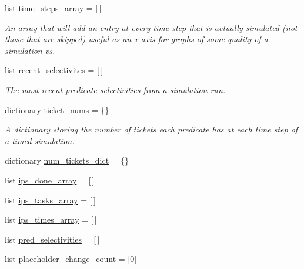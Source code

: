 \begin{DoxyCompactItemize}
list \mbox{\hyperlink{classdynamicfilterapp_1_1test__simulations_1_1_simulation_test_a75d7655922d64cff723f1ca630287683}{time\+\_\+steps\+\_\+array}} = \mbox{[}$\,$\mbox{]}
\begin{DoxyCompactList}\small\item\em An array that will add an entry at every time step that is actually simulated (not those that are skipped) useful as an x axis for graphs of some quality of a simulation vs. \end{DoxyCompactList}\item 
list \mbox{\hyperlink{classdynamicfilterapp_1_1test__simulations_1_1_simulation_test_a40252fb1880ae0d39411b74a939ca7d7}{recent\+\_\+selectivites}} = \mbox{[}$\,$\mbox{]}
\begin{DoxyCompactList}\small\item\em The most recent predicate selectivities from a simulation run. \end{DoxyCompactList}\item 
dictionary \mbox{\hyperlink{classdynamicfilterapp_1_1test__simulations_1_1_simulation_test_ae1cdb4bcaa53fc7ff453fd30fe952c36}{ticket\+\_\+nums}} = \{\}
\begin{DoxyCompactList}\small\item\em A dictionary storing the number of tickets each predicate has at each time step of a timed simulation. \end{DoxyCompactList}\item 
dictionary \mbox{\hyperlink{classdynamicfilterapp_1_1test__simulations_1_1_simulation_test_a1932cf55b0fd728b4535d4152da9cd70}{num\+\_\+tickets\+\_\+dict}} = \{\}
\item 
list \mbox{\hyperlink{classdynamicfilterapp_1_1test__simulations_1_1_simulation_test_a3a28c979e4715729a8703a138d478048}{ips\+\_\+done\+\_\+array}} = \mbox{[}$\,$\mbox{]}
\item 
list \mbox{\hyperlink{classdynamicfilterapp_1_1test__simulations_1_1_simulation_test_a313a3699dd7ec75b575ef56eb7d0c72a}{ips\+\_\+tasks\+\_\+array}} = \mbox{[}$\,$\mbox{]}
\item 
list \mbox{\hyperlink{classdynamicfilterapp_1_1test__simulations_1_1_simulation_test_ac043b655ae4e87f3cb92c37648ef7aba}{ips\+\_\+times\+\_\+array}} = \mbox{[}$\,$\mbox{]}
\item 
list \mbox{\hyperlink{classdynamicfilterapp_1_1test__simulations_1_1_simulation_test_addb8ece04e1f31bdd0a6d337ec23df4c}{pred\+\_\+selectivities}} = \mbox{[}$\,$\mbox{]}
\item 
list \mbox{\hyperlink{classdynamicfilterapp_1_1test__simulations_1_1_simulation_test_ace285c25e9e42a2458b93bc49e478c75}{placeholder\+\_\+change\+\_\+count}} = \mbox{[}0\mbox{]}

\end{DoxyCompactItemize}
